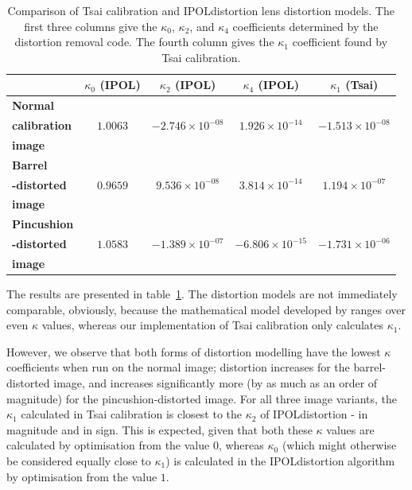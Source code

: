 \begin{table}[htb]
  \centering
  \begin{tabular}{| l | c c c | c |}
    \hline
    {\textbf{ }} &
    {\textbf{$\kappa_{0}$ (IPOL)}} &
    {\textbf{$\kappa_{2}$ (IPOL)}} &
    {\textbf{$\kappa_{4}$ (IPOL)}} &
    {\textbf{$\kappa_{1}$ (Tsai)}}\\
    \hline
    {\textbf{Normal}} & { } & { } & { } & { } \\
    {\textbf{calibration}} & {$1.0063$} & {$-2.746 \times 10^{-08}$} & {$1.926 \times 10^{-14}$} & {$-1.513 \times 10^{-08}$} \\
    {\textbf{image}} & { } & { } & { } & { } \\
    \hline
    {\textbf{Barrel}} & { } & { } & { } & { } \\
    {\textbf{-distorted}} & {$0.9659$} & {$9.536 \times 10^{-08}$} & {$3.814 \times 10^{-14}$} & {$1.194 \times 10^{-07}$} \\
    {\textbf{image}} & { } & { } & { } & { } \\
    \hline
    {\textbf{Pincushion}} & { } & { } & { } & { } \\
    {\textbf{-distorted}} & {$1.0583$} & {$-1.389 \times 10^{-07}$} & {$-6.806 \times 10^{-15}$} & {$-1.731 \times 10^{-06}$} \\
    {\textbf{image}} & { } & { } & { } & { } \\
    \hline
  \end{tabular}
  \caption[Comparison of Tsai calibration and IPOLdistortion lens distortion models]{Comparison of Tsai calibration and IPOLdistortion lens distortion models. The first three columns give the $\kappa_{0}$, $\kappa_{2}$, and $\kappa_{4}$ coefficients determined by the distortion removal code. The fourth column gives the $\kappa_{1}$ coefficient found by Tsai calibration.}
  \label{tbl:calib-distort-compare}
\end{table}

The results are presented in table~\ref{tbl:calib-distort-compare}. The distortion models are not immediately comparable, obviously, because the mathematical model developed by \cite{algebraic-distortion} ranges over even $\kappa$ values, whereas our implementation of Tsai calibration only calculates $\kappa_{1}$.

However, we observe that both forms of distortion modelling have the lowest $\kappa$ coefficients when run on the normal image; distortion increases for the barrel-distorted image, and increases significantly more (by as much as an order of magnitude) for the pincushion-distorted image. For all three image variants, the $\kappa_{1}$ calculated in Tsai calibration is closest to the $\kappa_{2}$ of IPOLdistortion - in magnitude and in sign. This is expected, given that both these $\kappa$ values are calculated by optimisation from the value $0$, whereas $\kappa_{0}$ (which might otherwise be considered equally close to $\kappa_{1}$) is calculated in the IPOLdistortion algorithm by optimisation from the value $1$.

